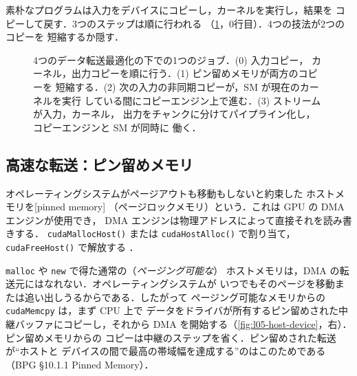 \documentclass[../main.tex]{subfiles}
\begin{document}
素朴なプログラムは入力をデバイスにコピーし，カーネルを実行し，結果を
コピーして戻す．3つのステップは順に行われる
（\cref{fig:l05-transfer-timelines}，0行目）．4つの技法が2つのコピーを
短縮するか隠す．

\begin{figure}[tb]
  \centering
  
  \caption{4つのデータ転送最適化の下での1つのジョブ．(0) 入力コピー，
    カーネル，出力コピーを順に行う．(1) ピン留めメモリが両方のコピーを
    短縮する．(2) 次の入力の非同期コピーが，SM が現在のカーネルを実行
    している間にコピーエンジン上で進む．(3) ストリームが入力，カーネル，
    出力をチャンクに分けてパイプライン化し，コピーエンジンと SM が同時に
    働く．}
  \label{fig:l05-transfer-timelines}
\end{figure}

\subsection{高速な転送：ピン留めメモリ}

\begin{definition}[ピン留めメモリ]
  オペレーティングシステムがページアウトも移動もしないと約束した
  ホストメモリを[pinned memory]
  （ページロックメモリ）という．これは GPU の DMA エンジンが使用でき，
  DMA エンジンは物理アドレスによって直接それを読み書きする．
  \texttt{cudaMallocHost()} または \texttt{cudaHostAlloc()} で割り当て，
  \texttt{cudaFreeHost()} で解放する \cite{harris2012datatransfer}．
\end{definition}

\texttt{malloc} や \texttt{new} で得た通常の（\emph{ページング可能な}）
ホストメモリは，DMA の転送元にはなれない．オペレーティングシステムが
いつでもそのページを移動または追い出しうるからである．したがって
ページング可能なメモリからの \texttt{cudaMemcpy} は，まず CPU 上で
データをドライバが所有するピン留めされた中継バッファにコピーし，それから
DMA を開始する（\cref{fig:l05-host-device}，右）．ピン留めメモリからの
コピーは中継のステップを省く．ピン留めされた転送が\enquote{ホストと
デバイスの間で最高の帯域幅を達成する}のはこのためである（BPG §10.1.1
Pinned Memory）．
\end{document}
